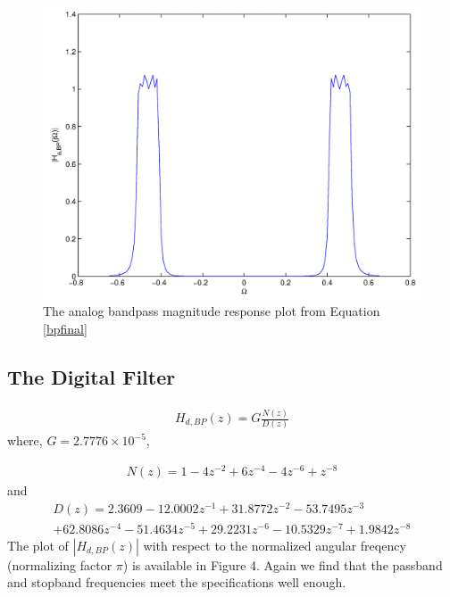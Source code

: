 \documentclass[journal,12pt,twocolumn]{IEEEtran}
\theoremstyle{remark}
\begin{document}
\begin{figure}[htbp] 
\centering
\includegraphics[width=\columnwidth]{figs/PNG/IIR/fig3.png}
\caption{The analog bandpass magnitude response plot from Equation \ref{bpfinal}}
\label{fig:fig3}
\end{figure}

\subsection{The Digital Filter}

\begin{eqnarray}
H_{d,BP}(z) = G \frac{N(z)}{D(z)}
\end{eqnarray}
where, $G = 2.7776 \times 10^{-5}$,

\begin{eqnarray}
N(z)=  1 - 4 z^{-2} + 6 z^{-4} - 4z^{-6} + z^{-8} 
\end{eqnarray}
and
\begin{multline}
D(z) = 2.3609  -12.0002z^{-1} + 31.8772z^{-2}  -53.7495z^{-3}\\+  62.8086z^{-4} - 51.4634z^{-5}+   29.2231z^{-6}  -10.5329z^{-7} +   1.9842z^{-8}
\end{multline}
The plot of $|H_{d,BP}(z)|$ with respect to the normalized angular freqency (normalizing factor $\pi$) is available in Figure 4.  Again we
find that the passband and stopband frequencies meet the specifications well enough.
\end{document}
